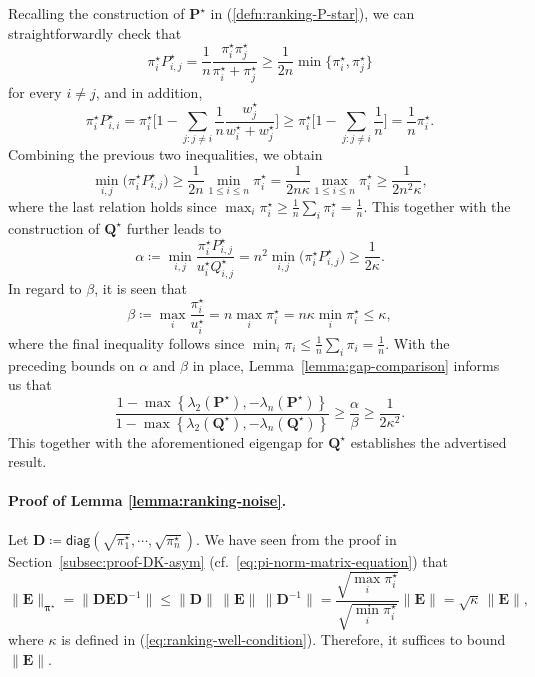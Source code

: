 Recalling the construction of $\bm{P}^{\star}$ in (\ref{defn:ranking-P-star}),
we can straightforwardly check that
%
\[
	\pi_{i}^{\star}P^{\star}_{i,j} %
	= \frac{1}{n}\frac{\pi_{i}^{\star}\pi_{j}^{\star}}{\pi_{i}^{\star}+\pi_{j}^{\star}} \geq\frac{1}{2n}\min\{\pi_{i}^{\star},\pi_{j}^{\star}\}
\]
%
for every $i\neq j$,  and in addition,
%
\[
\pi_{i}^{\star}P_{i,i}^{\star}=\pi_{i}^{\star}\Bigg[1-\sum_{j:j\neq i}\frac{1}{n}\frac{w_{j}^{\star}}{w_{i}^{\star}+w_{j}^{\star}}\Bigg]\geq\pi_{i}^{\star}\Bigg[1-\sum_{j:j\neq i}\frac{1}{n}\Bigg]=\frac{1}{n}\pi_{i}^{\star}.
\]
%
Combining the previous two inequalities, we obtain
%
\[
	\min_{i,j} \big( \pi^{\star}_i P^{\star}_{i,j} \big)
	\geq\frac{1}{2n}\min_{1\leq i\leq n}\pi_{i}^{\star}
	= \frac{1}{2n\kappa}\max_{1\leq i\leq n}\pi_{i}^{\star}
	\geq\frac{1}{2n^{2}\kappa},
\]
%
where the last relation holds since $\max_{ i}\pi_{i}^{\star}\geq \frac{1}{n}\sum_i\pi_i^{\star} = \frac{1}{n}$.
This together with the construction of $\bm{Q}^{\star}$ further leads to
%
\[
	\alpha \coloneqq \min_{i,j}\frac{\pi_{i}^{\star}P^{\star}_{i,j}}{u_{i}^{\star}Q^{\star}_{i,j}}
	=n^{2}\min_{i,j} \big( \pi^{\star}_i P^{\star}_{i,j} \big)
	\geq\frac{1}{2\kappa}.
\]
%
In regard to $\beta$, it is seen that
%
\[
	\beta\coloneqq \max_i \frac{\pi^{\star}_i}{u^{\star}_i} = n\max_{ i}\pi_{i}^{\star}
	= n\kappa \min_{i}\pi_{i}^{\star}
	\leq \kappa,
\]
%
where the final inequality follows since $\min_i\pi_i\leq \frac{1}{n}\sum_i\pi_i = \frac{1}{n}$. With the preceding bounds on $\alpha$ and $\beta$ in place,
Lemma~\ref{lemma:gap-comparison} informs us that
%
\[
\frac{1-\max\left\{ \lambda_{2}(\bm{P}^{\star}),-\lambda_{n}(\bm{P}^{\star})\right\} }{1-\max\left\{ \lambda_{2}(\bm{Q}^{\star}),-\lambda_{n}(\bm{Q}^{\star})\right\} }\geq\frac{\alpha}{\beta}\geq\frac{1}{2\kappa^{2}}.
\]
%
This together with the aforementioned  eigengap for $\bm{Q}^{\star}$
establishes the advertised result.



\paragraph{Proof of Lemma \ref{lemma:ranking-noise}.}

Let $\bm{D} \coloneqq \mathsf{diag}(\sqrt{\pi_1^{\star}},\cdots,\sqrt{\pi_n^{\star}})$. We have seen from the proof in Section~\ref{subsec:proof-DK-asym} (cf.~\eqref{eq:pi-norm-matrix-equation}) that
\[
	\|\bm{E}\|_{\bm{\pi}^{\star}} =\|\bm{D}\bm{E}\bm{D}^{-1}\| \leq  \|\bm{D}\|\, \|\bm{E}\| \, \|\bm{D}^{-1}\| = \frac{  \sqrt{\max_i \pi_i^{\star}} } {  \sqrt{\min_i \pi_i^{\star}} }  \|\bm{E}\|
	=  \sqrt{\kappa} \, \|\bm{E}\|,
\]
%
where $\kappa$ is defined in (\ref{eq:ranking-well-condition}).
Therefore, it suffices to bound $\|\bm{E}\|$.

